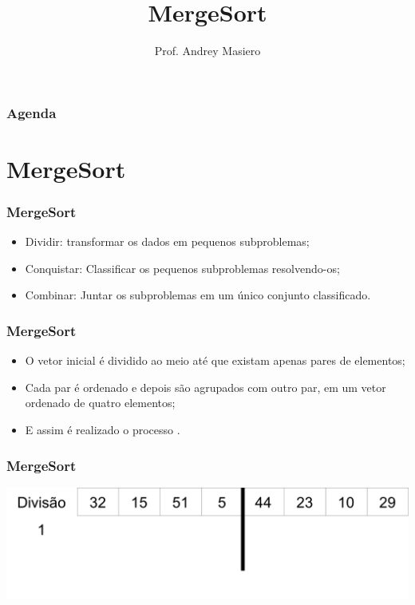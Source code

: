 \documentclass{beamer}
\begin{document}
\title[MergeSort]{MergeSort}
\author{Prof. Andrey Masiero}

\begin{frame}
  \titlepage
\end{frame}

\begin{frame}
  \frametitle{Agenda}
  \tableofcontents
\end{frame}

\section{MergeSort}

\begin{frame}
	\frametitle{MergeSort}
    \begin{itemize}[<+->]
        \item Dividir: transformar os dados em pequenos subproblemas;
        \item Conquistar: Classificar os pequenos subproblemas resolvendo-os;
        \item Combinar: Juntar os subproblemas em um único conjunto classificado.
    \end{itemize}
\end{frame}

\begin{frame}
    \frametitle{MergeSort}
    \begin{itemize}[<+->]
        \item O vetor inicial é dividido ao meio até que existam apenas pares de elementos;
        \item Cada par é ordenado e depois são agrupados com outro par, em um vetor ordenado de quatro elementos;
        \item E assim é realizado o processo .
    \end{itemize}
\end{frame}

\begin{frame}
    \frametitle{MergeSort}
    \centering
    \includegraphics[scale=0.5]{images/1.png}
\end{frame}
\end{document}
